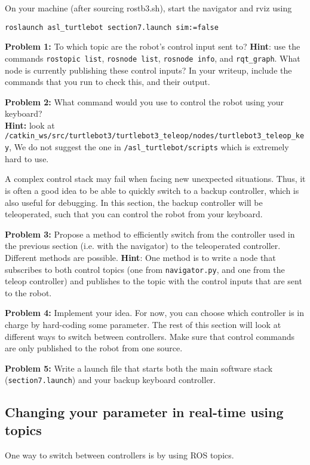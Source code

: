 \documentclass{article}
\begin{document}
On your machine (after sourcing rostb3.sh), start the navigator and rviz using
\begin{lstlisting}
roslaunch asl_turtlebot section7.launch sim:=false
\end{lstlisting}

\textbf{Problem 1: } To which topic are the robot's control input sent to? \textbf{Hint}: use the commands \texttt{rostopic list}, \texttt{rosnode list}, \texttt{rosnode info}, and \texttt{rqt\_graph}. What node is currently publishing these control inputs? In your writeup, include the commands that you run to check this, and their output.

\textbf{Problem 2: } What command would you use to control the robot using your keyboard? %
\\\textbf{Hint:} look at \texttt{/catkin\_ws/src/turtlebot3/turtlebot3\_teleop/nodes/turtlebot3\_teleop\_key}, We do not suggest the one in \texttt{/asl\_turtlebot/scripts} which is extremely hard to use.

A complex control stack may fail when facing new unexpected situations. Thus, it is often a good idea to be able to quickly switch to a backup controller, which is also useful for debugging. In this section, the backup controller will be teleoperated, such that you can control the robot from your keyboard. 

\textbf{Problem 3: } Propose a method to efficiently switch from the controller used in the previous section (i.e. with the navigator) to the teleoperated controller. Different methods are possible.
\textbf{Hint}: One method is to write a node that subscribes to both control topics (one from \texttt{navigator.py}, and one from the teleop controller) and publishes to the topic with the control inputs that are sent to the robot.

\textbf{Problem 4: } Implement your idea. For now, you can choose which controller is in charge by hard-coding some parameter. The rest of this section will look at different ways to switch between controllers. Make sure that control commands are only published to the robot from one source.

\textbf{Problem 5: } Write a launch file that starts both the main software stack (\texttt{section7.launch}) and your backup keyboard controller. 

\subsection{Changing your parameter in real-time using topics}
One way to switch between controllers is by using ROS topics.
\end{document}
